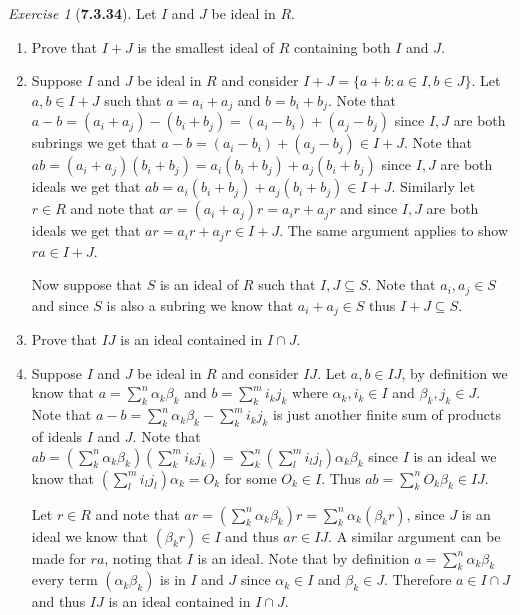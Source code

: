 \documentclass[12pt]{amsart}
\makeatletter
\theoremstyle{remark}
\newtheorem*{exercise}{Exercise}%
\renewenvironment{proof}[1][\proofname]{\par\doublespacing
  \pushQED{\qed}%
  \normalfont \topsep6\p@\@plus6\p@\relax
  \list{}{%
    \settowidth{\leftmargin}{\itshape\proofname:\hskip\labelsep}%
    \setlength{\labelwidth}{0pt}%
    \setlength{\itemindent}{-\leftmargin}%
  }%
  \item[\hskip\labelsep\itshape#1\@addpunct{:}]\ignorespaces
}{%
  \popQED\endlist\@endpefalse
  \singlespacing
}
\theoremstyle{mycomment}
\makeatother
\begin{document}
\begin{exercise}[\textbf{7.3.34}] Let $I$ and $J$ be ideal in $R$.
    \begin{enumerate}
    \item[a.] Prove that $I + J$ is the smallest ideal of $R$ containing both $I$ and $J$. 
    \begin{proof} Suppose $I$ and $J$ be ideal in $R$ and consider $I + J = \{a + b: a \in I, b \in J\}$. Let $a, b \in I + J$ such that $a = a_i + a_j$ and $b = b_i + b_j$. 
      Note that $a - b = (a_i + a_j) - (b_i + b_j) = (a_i - b_i) + (a_j - b_j)$ since $I, J$ are both subrings we get that  $a - b = (a_i - b_i) + (a_j - b_j) \in I + J$. 
      Note that $ab = (a_i + a_j)(b_i + b_j) = a_i(b_i + b_j) + a_j(b_i + b_j)$ since $I, J$ are both ideals we get that $ab = a_i(b_i + b_j) + a_j(b_i + b_j) \in I + J$. 
      Similarly let $r \in R$ and note that $ar = (a_i + a_j)r = a_ir + a_jr$ and since $I, J$ are both ideals we get that $ar = a_ir + a_jr \in I + J$. The same argument applies to show $ra \in I + J$. 


      Now suppose that $S$ is an ideal of $R$ such that $I, J \subseteq S$. Note that $a_i, a_j \in S$ and since $S$ is also a subring we know that $a_i + a_j \in S$ thus $I + J \subseteq S$. 
    \end{proof}
    \vspace{.15in}

    \item[b.] Prove that $IJ$ is an ideal contained in $I \cap J$. 
    \begin{proof} Suppose $I$ and $J$ be ideal in $R$ and consider $IJ$. Let $a, b \in IJ$, by definition we know that $a = \sum_k^n \alpha_k\beta_k$ and $b = \sum_k^m i_k j_k$ where $\alpha_k, i_k \in I$ and $\beta_k, j_k \in J$. 
      Note that $a - b = \sum_k^n \alpha_k\beta_k - \sum_k^m i_k j_k$ is just another finite sum of products of ideals $I$ and $J$. Note that $ab = (\sum_k^n \alpha_k\beta_k)(\sum_k^m i_k j_k) = \sum_k^n (\sum_l^m i_l j_l)\alpha_k\beta_k$ 
      since $I$ is an ideal we know that $(\sum_l^m i_l j_l)\alpha_k = O_k$ for some $O_k \in I$. Thus $ab = \sum_k^n O_k\beta_k \in IJ$.
      
      Let $r \in R$ and note that $ar = (\sum_k^n \alpha_k\beta_k)r = \sum_k^n \alpha_k(\beta_kr)$, since $J$ is an ideal we know that $(\beta_kr) \in I$ and thus $ar \in IJ$. A similar argument can be made for $ra$, noting that $I$ is an ideal. 
      Note that by definition $a =\sum_k^n \alpha_k\beta_k$ every term $(\alpha_k\beta_k)$ is in $I$ and $J$ since $\alpha_k \in I$ and $\beta_k \in J$. Therefore $a \in I \cap J$ and thus $IJ$ is an ideal contained in $I \cap J$.
    \end{proof}
    \vspace{.15in}



\end{enumerate}
\end{exercise}
\end{document}
